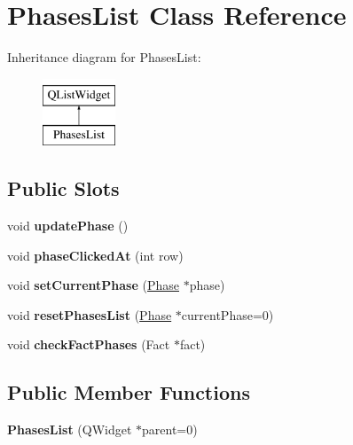 \hypertarget{class_phases_list}{\section{Phases\-List Class Reference}
\label{class_phases_list}
}
Inheritance diagram for Phases\-List\-:\begin{figure}[H]
\begin{center}
\leavevmode
\includegraphics[height=2.000000cm]{class_phases_list}
\end{center}
\end{figure}
\subsection*{Public Slots}
\begin{DoxyCompactItemize}
\item 
\hypertarget{class_phases_list_a3ce1e0c4ea0958d2722c96a796c150ef}{void {\bfseries update\-Phase} ()}\label{class_phases_list_a3ce1e0c4ea0958d2722c96a796c150ef}

\item 
\hypertarget{class_phases_list_a4d553f3649af889bc0aba38234c38207}{void {\bfseries phase\-Clicked\-At} (int row)}\label{class_phases_list_a4d553f3649af889bc0aba38234c38207}

\item 
\hypertarget{class_phases_list_abf57da98d13481484b719e6204ba7443}{void {\bfseries set\-Current\-Phase} (\hyperlink{class_phase}{Phase} $\ast$phase)}\label{class_phases_list_abf57da98d13481484b719e6204ba7443}

\item 
\hypertarget{class_phases_list_a8f42bc8b8fef4539c1624bcd8bec16fb}{void {\bfseries reset\-Phases\-List} (\hyperlink{class_phase}{Phase} $\ast$current\-Phase=0)}\label{class_phases_list_a8f42bc8b8fef4539c1624bcd8bec16fb}

\item 
\hypertarget{class_phases_list_addb5d64beafbb828592513169737bdb3}{void {\bfseries check\-Fact\-Phases} (Fact $\ast$fact)}\label{class_phases_list_addb5d64beafbb828592513169737bdb3}

\end{DoxyCompactItemize}
\subsection*{Public Member Functions}
\begin{DoxyCompactItemize}
\item 
\hypertarget{class_phases_list_a60de11a8a4f2d0382894ee5df014fdbd}{{\bfseries Phases\-List} (Q\-Widget $\ast$parent=0)}\label{class_phases_list_a60de11a8a4f2d0382894ee5df014fdbd}

\end{DoxyCompactItemize}
